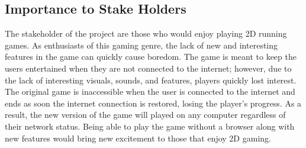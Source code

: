 \documentclass{article}
\begin{document}
\subsection*{Importance to Stake Holders}
\qquad The stakeholder of the project are those who would enjoy playing 2D running games. As enthusiasts of this gaming genre, the lack of new and interesting features in the game can quickly cause boredom. The game is meant to keep the users entertained when they are not connected to the internet; however, due to the lack of interesting visuals, sounds, and features, players quickly lost interest. The original game is inaccessible when the user is connected to the internet and ends as soon the internet connection is restored, losing the player's progress. As a result, the new version of the game will played on any computer regardless of their network status. Being able to play the game without a browser along with new features would bring new excitement to those that enjoy 2D gaming.
\end{document}
